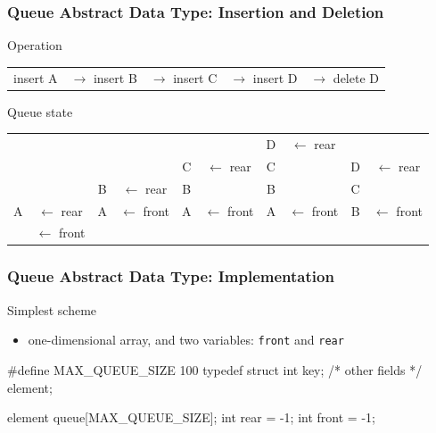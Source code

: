 \documentclass[newPxFont,sthlmFooter,nooffset]{beamer}
\begin{document}
\begin{frame}[t]
  \frametitle{Queue Abstract Data Type:  Insertion and Deletion}

Operation
{\footnotesize  \begin{centering}
\begin{tabular}{!{}c<{}c<{}c<{}c<{}c}
insert A & $\rightarrow$ insert B &  $\rightarrow$ insert C &  $\rightarrow$ insert D &  $\rightarrow$ delete D  \\
    \end{tabular}
  \end{centering}}

{ Queue state}

{\footnotesize  \begin{centering}
\begin{tabular}{!{} c<{}c<{}c<{}c<{}c<{}c<{}c<{}c<{}c<{}c}
       &                   &   &  &   &  & D & $\leftarrow$ rear &  &  \\
       &                   &   &  & C & $\leftarrow$ rear & C &  & D & $\leftarrow$ rear \\
       &                   & B & $\leftarrow$ rear & B &  & B &  & C &  \\
     A & $\leftarrow$ rear & A & $\leftarrow$ front & A & $\leftarrow$ front & A & $\leftarrow$ front & B & $\leftarrow$ front \\
       & $\leftarrow$ front & & &  & &  & &  & \\
    \end{tabular}
  \end{centering}}
\end{frame}

\begin{frame}[t, fragile]
  \frametitle{Queue Abstract Data Type: Implementation}
Simplest scheme
\begin{itemize}
\item one-dimensional array, and two variables: \texttt{front} and \texttt{rear}
\end{itemize}

\begin{ncodedef}
#define MAX_QUEUE_SIZE 100  
typedef struct {
    int key;
    /* other fields */
} element;

element queue[MAX_QUEUE_SIZE];
int rear = -1;
int front = -1;
\end{ncodedef}
\end{frame}
\end{document}
